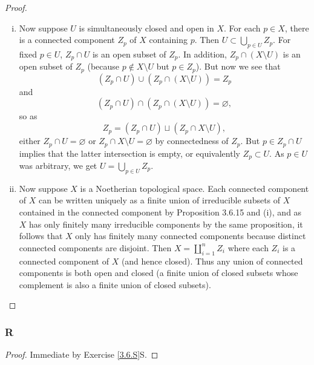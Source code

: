 \documentclass{article}
\let\emptyset\varnothing
\theoremstyle{definition} %
\begin{document}
\begin{proof}
\begin{enumerate}[(i)]
        \item Now suppose $U$ is simultaneously closed and open in $X$. For each $p\in X$, there is a connected component $Z_p$ of $X$ containing $p$. Then $U\subset \bigcup_{p\in U} Z_p$. For fixed $p\in U$, $Z_p\cap U$ is an open subset of $Z_p$. In addition, $Z_p \cap (X\setminus U)$ is an open subset of $Z_p$ (because $p \notin X\setminus U$ but $p\in Z_p$). But now we see that
        \[
        (Z_p \cap U) \cup (Z_p \cap (X\setminus U)) = Z_p
        \]
        and
        \[
        (Z_p \cap U) \cap (Z_p \cap (X\setminus U)) = \emptyset,
        \]
        so as 
        \[
        Z_p = (Z_p \cap U) \sqcup (Z_p \cap X\setminus U),
        \]
        either $Z_p \cap U = \emptyset$ or $Z_p \cap X\setminus U= \emptyset$ by connectedness of $Z_p$. But $p\in Z_p\cap U$ implies that the latter intersection is empty, or equivalently $Z_p\subset U$. As $p\in U$ was arbitrary, we get $U=\bigcup_{p\in U} Z_p$.
        \item Now suppose $X$ is a Noetherian topological space. Each connected component of $X$ can be written uniquely as a finite union of irreducible subsets of $X$ contained in the connected component by Proposition 3.6.15 and (i), and as $X$ has only finitely many irreducible components by the same proposition, it follows that $X$ only has finitely many connected components because distinct connected components are disjoint. Then $X=\coprod_{i=1}^n Z_i$ where each $Z_i$ is a connected component of $X$ (and hence closed). Thus any union of connected components is both open and closed (a finite union of closed subsets whose complement is also a finite union of closed subsets).
    \end{enumerate}
\end{proof}
\subsubsection{R}\label{3.6.R}
\begin{proof}
    Immediate by Exercise \ref{3.6.S}S.
\end{proof}
\end{document}
